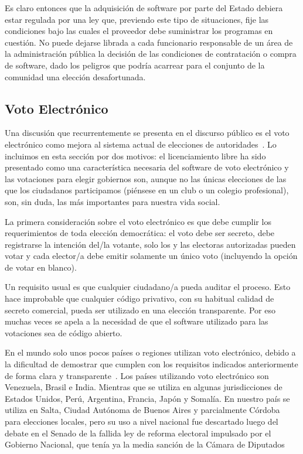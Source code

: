 Es claro entonces que la adquisición de software por parte del Estado debiera estar regulada por una ley que, previendo este tipo de situaciones, fije las condiciones bajo las cuales el proveedor debe suministrar los programas en cuestión. No puede dejarse librada a cada funcionario responsable de un área de la administración pública la decisión de las condiciones de contratación o compra de software, dado los peligros que podría acarrear para el conjunto de la comunidad una elección desafortunada.


\subsection{Voto Electrónico}

Una discusión que recurrentemente se presenta en el discurso público es el voto electrónico como mejora al sistema actual de elecciones de autoridades~\cite{lanacion17, serra17}. Lo incluimos en esta sección por dos motivos: el licenciamiento libre ha sido presentado como una característica necesaria del software de voto electrónico y las votaciones para elegir gobiernos son, aunque no las únicas elecciones de las que los ciudadanos participamos (piénsese en un club o un colegio profesional), son, sin duda, las más importantes para nuestra vida social.

La primera consideración sobre el voto electrónico es que debe cumplir los requerimientos de toda elección democrática: el voto debe ser secreto, debe registrarse la intención del/la votante, solo los y las electoras autorizadas pueden votar y cada elector/a debe emitir solamente un único voto (incluyendo la opción de votar en blanco). 

Un requisito usual es que cualquier ciudadano/a pueda auditar el proceso. Esto hace improbable que cualquier código privativo, con su habitual calidad de secreto comercial, pueda ser utilizado en una elección transparente. Por eso muchas veces se apela a la necesidad de que el software utilizado para las votaciones sea de código abierto.

En el mundo solo unos pocos países o regiones utilizan voto electrónico, debido a la dificultad de demostrar que cumplen con los requisitos indicados anteriormente de forma clara y transparente~\cite{smaldone16}. Los países utilizando voto electrónico son Venezuela, Brasil e India. Mientras que se utiliza en algunas jurisdicciones de Estados Unidos, Perú, Argentina, Francia, Japón y Somalía. En nuestro país se utiliza en Salta, Ciudad Autónoma de Buenos Aires y parcialmente Córdoba~\cite{origlia16} para elecciones locales, pero su uso a nivel nacional fue descartado luego del debate en el Senado de la fallida ley de reforma electoral impulsado por el Gobierno Nacional, que tenía ya la media sanción de la Cámara de Diputados~\cite{ybarra16}

